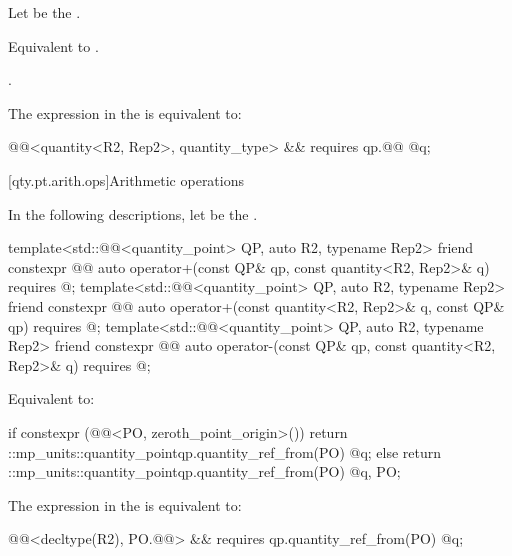 \begin{itemdescr}
\pnum
Let  be the .

\pnum
\effects
Equivalent to
.

\pnum
\returns
{}.

\pnum
\remarks
The expression in the  is equivalent to:
\begin{codeblock}
@@<quantity<R2, Rep2>, quantity_type> &&
  requires { qp.@@ @\atsign@ q; }
\end{codeblock}
\end{itemdescr}

[qty.pt.arith.ops]{Arithmetic operations}

\pnum
In the following descriptions,
let  be the .

\begin{itemdecl}
template<std::@@<quantity_point> QP, auto R2, typename Rep2>
friend constexpr @@ auto operator+(const QP& qp, const quantity<R2, Rep2>& q)
  requires @\seebelownc@;
template<std::@@<quantity_point> QP, auto R2, typename Rep2>
friend constexpr @@ auto operator+(const quantity<R2, Rep2>& q, const QP& qp)
  requires @\seebelownc@;
template<std::@@<quantity_point> QP, auto R2, typename Rep2>
friend constexpr @@ auto operator-(const QP& qp, const quantity<R2, Rep2>& q)
  requires @\seebelownc@;
\end{itemdecl}

\begin{itemdescr}
\pnum
\effects
Equivalent to:
\begin{codeblock}
if constexpr (@@<PO, zeroth_point_origin>())
  return ::mp_units::quantity_point{qp.quantity_ref_from(PO) @\atsign@ q};
else
  return ::mp_units::quantity_point{qp.quantity_ref_from(PO) @\atsign@ q, PO};
\end{codeblock}

\pnum
\remarks
The expression in the  is equivalent to:
\begin{codeblock}
@@<decltype(R2), PO.@@> && requires {
  qp.quantity_ref_from(PO) @\atsign@ q;
}
\end{codeblock}
\end{itemdescr}

